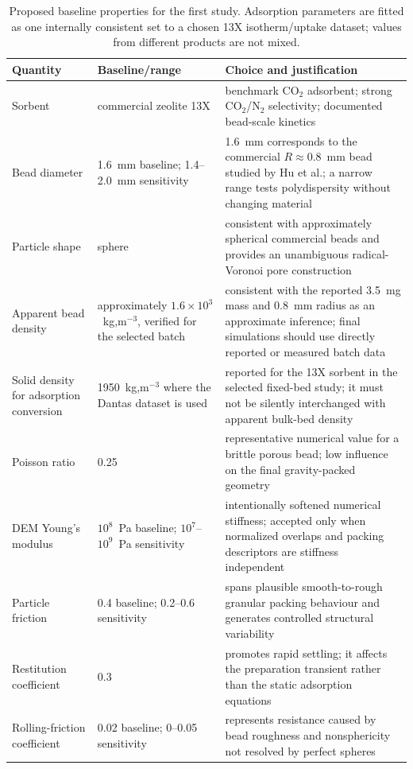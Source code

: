 \documentclass[12pt,a4paper]{article}
\begin{document}
\begin{table}[!htbp]
\centering
\caption{Proposed baseline properties for the first study. Adsorption
parameters are fitted as one internally consistent set to a chosen 13X
isotherm/uptake dataset; values from different products are not mixed.}
\label{tab:parameters}
\scriptsize
\renewcommand{\arraystretch}{0.88}
\begin{tabular}{P{3.25cm}P{3.1cm}P{6.45cm}}
\toprule
\textbf{Quantity} & \textbf{Baseline/range} & \textbf{Choice and justification} \\
\midrule
Sorbent & commercial zeolite 13X & benchmark CO$_2$ adsorbent; strong CO$_2$/N$_2$ selectivity; documented bead-scale kinetics \\
Bead diameter & 1.6~mm baseline; 1.4--2.0~mm sensitivity & 1.6~mm corresponds to the commercial $R\approx0.8$~mm bead studied by Hu et al.; a narrow range tests polydispersity without changing material \\
Particle shape & sphere & consistent with approximately spherical commercial beads and provides an unambiguous radical-Voronoi pore construction \\
Apparent bead density & approximately $1.6\times10^3$~kg,m$^{-3}$, verified for the selected batch & consistent with the reported 3.5~mg mass and 0.8~mm radius as an approximate inference; final simulations should use directly reported or measured batch data \\
Solid density for adsorption conversion & 1950~kg,m$^{-3}$ where the Dantas dataset is used & reported for the 13X sorbent in the selected fixed-bed study; it must not be silently interchanged with apparent bulk-bed density \\
Poisson ratio & 0.25 & representative numerical value for a brittle porous bead; low influence on the final gravity-packed geometry \\
DEM Young's modulus & $10^8$~Pa baseline; $10^7$--$10^9$~Pa sensitivity & intentionally softened numerical stiffness; accepted only when normalized overlaps and packing descriptors are stiffness independent \\
Particle friction & 0.4 baseline; 0.2--0.6 sensitivity & spans plausible smooth-to-rough granular packing behaviour and generates controlled structural variability \\
Restitution coefficient & 0.3 & promotes rapid settling; it affects the preparation transient rather than the static adsorption equations \\
Rolling-friction coefficient & 0.02 baseline; 0--0.05 sensitivity & represents resistance caused by bead roughness and nonsphericity not resolved by perfect spheres \\

\end{tabular}
\end{table}
\end{document}
